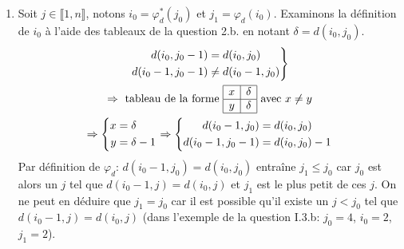 \begin{enumerate}
  \item Soit $j\in \llbracket 1,n \rrbracket$, notons $i_0=\varphi^*_d(j_0)$ et $j_1=\varphi_d(i_0)$.\newline
Examinons la définition de $i_0$ à l'aide des tableaux de la question 2.b. en notant $\delta=d(i_0,j_0)$.
\begin{multline*}
\left. 
\begin{aligned}
 d(i_0 , j_0-1) &= d(i_0,j_0) \\ d(i_0 -1,j_0 -1) &\neq d(i_0 -1,j_0) 
\end{aligned}
\right\rbrace \\ \Rightarrow 
\text{ tableau de la forme }
\begin{array}{|c|c|} \hline
  x & \delta \\ \hline
  y & \delta \\ \hline  
\end{array}
\text{ avec } x\neq y \\
\Rightarrow
\left\lbrace 
\begin{aligned}
  x &= \delta  \\ y &= \delta -1
\end{aligned}
\right. \Rightarrow
\left\lbrace 
\begin{aligned}
 d(i_0 - 1,j_0) &= d(i_0,j_0) \\  d(i_0 - 1,j_0 -1) &= d(i_0,j_0) -1 
\end{aligned}
\right.
\end{multline*}
Par définition de $\varphi_d$: $d(i_0 - 1,j_0) = d(i_0,j_0)$ entraîne $j_1 \leq j_0$ car $j_0$ est alors un $j$ tel que $d(i_0 - 1,j) = d(i_0,j)$ et $j_1$ est le plus petit de ces $j$.\newline
On ne peut en déduire que $j_1=j_0$ car il est possible qu'il existe un $j<j_0$ tel que $d(i_0 - 1,j) = d(i_0,j)$ (dans l'exemple de la question I.3.b: $j_0=4$, $i_0=2$, $j_1=2$).
\end{enumerate}

